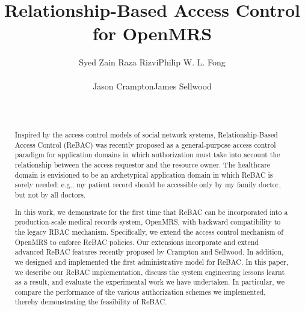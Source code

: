 \documentclass{acm_proc_article-sp}
\begin{document}
\title{Relationship-Based Access Control for OpenMRS}





 \author{
\alignauthor
Syed Zain Raza Rizvi\quad Philip W. L. Fong\\
\\
\alignauthor
Jason Crampton\qquad James Sellwood\\
\\
\\
}


\maketitle

\begin{abstract}
  Inspired by the access control models of social network systems,
  Relationship-Based Access Control (ReBAC) was recently proposed as a
  general-purpose access control paradigm for application domains in
  which authorization must take into account the relationship between
  the access requestor and the resource owner.  The healthcare domain
  is envisioned to be an archetypical application domain in which
  ReBAC is sorely needed: e.g., my patient record should be accessible
  only by my family doctor, but not by all doctors.

  In this work, we demonstrate for the first time that ReBAC can be
  incorporated into a production-scale medical records system,
  OpenMRS, with backward compatibility to the legacy RBAC mechanism.
  Specifically, we extend the access control mechanism of OpenMRS to
  enforce ReBAC policies.  Our extensions incorporate and extend
  advanced ReBAC features recently proposed by Crampton and Sellwood.
  In addition, we designed and implemented the first administrative
  model for ReBAC. In this paper, we describe our ReBAC
  implementation, discuss the system engineering lessons learnt
  as a result, and evaluate the experimental work we have undertaken.
  In particular, we compare the performance of the various
  authorization schemes we implemented, thereby demonstrating the
  feasibility of ReBAC.
\end{abstract}

\end{document}
